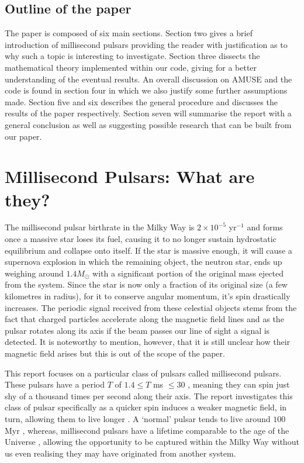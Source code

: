 \subsection{Outline of the paper}

The paper is composed of six main sections. Section two gives a brief introduction of millisecond pulsars providing the reader with justification as to why such a topic is interesting to investigate. Section three dissects the mathematical theory implemented within our code, giving for a better understanding of the eventual results. An overall discussion on AMUSE and the code is found in section four in which we also justify some further assumptions made. Section five and six describes the general procedure and discusses the results of the paper respectively. Section seven will summarise the report with a general conclusion as well as suggesting possible research that can be built from our paper.


\section{Millisecond Pulsars: What are they?}

The millisecond pulsar birthrate in the Milky Way is $2\times10^{-5}$ yr$^{-1}$ \citep{Lorimer1999} and forms once a massive star loses its fuel, causing it to no longer sustain hydrostatic equilibrium and collapse onto itself. If the star is massive enough, it will cause a supernova explosion in which the remaining object, the neutron star, ends up weighing around $1.4M_\odot$ with a significant portion of the original mass ejected from the system. Since the star is now only a fraction of its original size (a few kilometres in radius), for it to conserve angular momentum, it's spin drastically increases. The periodic signal received from these celestial objects stems from the fact that charged particles accelerate along the magnetic field lines and as the pulsar rotates along its axis if the beam passes our line of sight a signal is detected. It is noteworthy to mention, however, that it is still unclear how their magnetic field arises \citep{Magnetic} but this is out of the scope of the paper.

This report focuses on a particular class of pulsars called millisecond pulsars. These pulsars have a period $T$ of $1.4 \leq T$ ms $\leq 30$ \citep{Lorimer2008}, meaning they can spin just shy of a thousand times per second along their axis. The report investigates this class of pulsar specifically as a quicker spin induces a weaker magnetic field, in turn, allowing them to live longer \citep{Phinney}. A `normal' pulsar tends to live around $100$ Myr \citep{Toscano}, whereas, millisecond pulsars have a lifetime comparable to the age of the Universe \citep{Lorimer2008}, allowing the opportunity to be captured within the Milky Way without us even realising they may have originated from another system.

